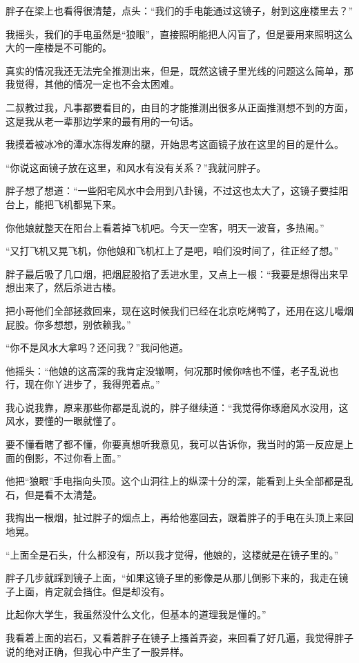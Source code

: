 胖子在梁上也看得很清楚，点头：“我们的手电能通过这镜子，射到这座楼里去？”

我摇头，我们的手电虽然是“狼眼”，直接照明能把人闪盲了，但是要用来照明这么大的一座楼是不可能的。

真实的情况我还无法完全推测出来，但是，既然这镜子里光线的问题这么简单，那我觉得，其他的情况一定也不会太困难。

二叔教过我，凡事都要看目的，由目的才能推测出很多从正面推测想不到的方面，这是我从老一辈那边学来的最有用的一句话。

我摸着被冰冷的潭水冻得发麻的腿，开始思考这面镜子放在这里的目的是什么。

“你说这面镜子放在这里，和风水有没有关系？”我就问胖子。

胖子想了想道：“一些阳宅风水中会用到八卦镜，不过这也太大了，这镜子要挂阳台上，能把飞机都晃下来。

你他娘就整天在阳台上看着掉飞机吧。今天一空客，明天一波音，多热闹。”

“又打飞机又晃飞机，你他娘和飞机杠上了是吧，咱们没时间了，往正经了想。”

胖子最后吸了几口烟，把烟屁股掐了丢进水里，又点上一根：“我要是想得出来早想出来了，然后杀进古楼。

把小哥他们全部拯救回来，现在这时候我们已经在北京吃烤鸭了，还用在这儿嘬烟屁股。你多想想，别依赖我。”

“你不是风水大拿吗？还问我？”我问他道。

他摇头：“他娘的这高深的我肯定没辙啊，何况那时候你啥也不懂，老子乱说也行，现在你丫进步了，我得兜着点。”

我心说我靠，原来那些你都是乱说的，胖子继续道：“我觉得你琢磨风水没用，这风水，要懂的一眼就懂了。

要不懂看瞎了都不懂，你要真想听我意见，我可以告诉你，我当时的第一反应是上面的倒影，不过你看上面。”

他把“狼眼”手电指向头顶。这个山洞往上的纵深十分的深，能看到上头全部都是乱石，但是看不太清楚。

我掏出一根烟，扯过胖子的烟点上，再给他塞回去，跟着胖子的手电在头顶上来回地晃。

“上面全是石头，什么都没有，所以我才觉得，他娘的，这楼就是在镜子里的。”

胖子几步就踩到镜子上面，“如果这镜子里的影像是从那儿倒影下来的，我走在镜子上面，肯定就会挡住。但是却没有。

比起你大学生，我虽然没什么文化，但基本的道理我是懂的。”

我看着上面的岩石，又看着胖子在镜子上搔首弄姿，来回看了好几遍，我觉得胖子说的绝对正确，但我心中产生了一股异样。

